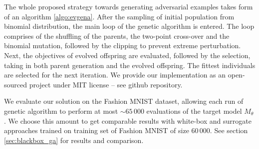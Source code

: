 The whole proposed strategy towards generating adversarial examples takes form of an algorithm \ref{algo:evgena}. After the sampling of initial population from binomial distribution, the main loop of the genetic algorithm is entered. The loop comprises of the shuffling of the parents, the two-point cross-over and the binomial mutation, followed by the clipping to prevent extreme perturbation. Next, the objectives of evolved offspring are evaluated, followed by the selection, taking in both parent generation and the evolved offspring. The fittest individuals are selected for the next iteration. We provide our implementation as an open-sourced project under MIT license -- see \cite{git_evgena} github repository.

We evaluate our solution on the Fashion MNIST dataset, allowing each run of genetic algorithm to perform at most $\sim 65\,000$ evaluations of the target model $M_\theta$. We choose this amount to get comparable results with white-box and surrogate approaches trained on training set of Fashion MNIST of size $60\,000$. See section \ref{sec:blackbox_ga} for results and comparison.
